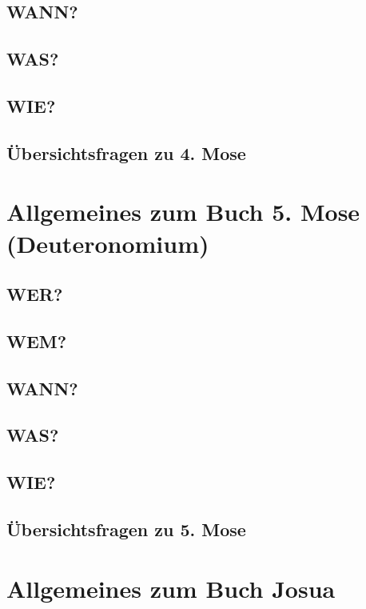 \subsection{WANN?}
\subsection{WAS?}
\subsection{WIE?}
\subsection{Übersichtsfragen zu 4. Mose}
    
\section{Allgemeines zum Buch 5. Mose (Deuteronomium)}
\subsection{WER?}
\subsection{WEM?}
\subsection{WANN?}
\subsection{WAS?}
\subsection{WIE?}
\subsection{Übersichtsfragen zu 5. Mose}
    
\section{Allgemeines zum Buch Josua}
